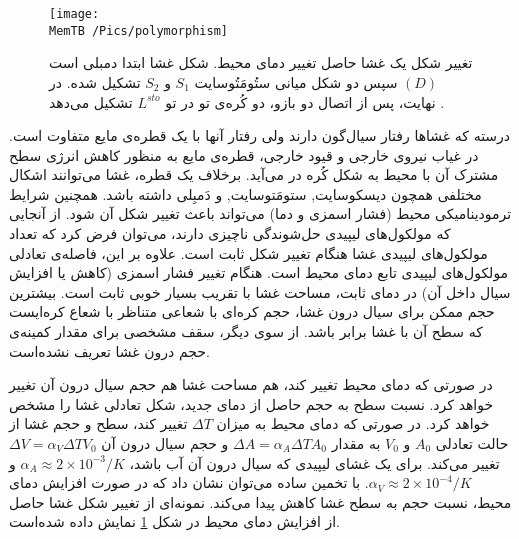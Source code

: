 \begin{figure}[t]
\begin{center}
\texttt{[image: \\MemTB /Pics/polymorphism]}
\caption{
تغییر شکل یک غشا حاصل تغییر دمای محیط. شکل غشا ابتدا دمبلی است 
$(D)$
سپس دو شکل میانی ستُومَتُوسایت
$S_1$
و
$S_2$
تشکیل شده. در نهایت، پس از اتصال دو بازو، دو کُره‌ی تو در تو 
$L^{sto}$
تشکیل می‌دهد 
\cite{Berndl1990EPL}.
}
\label{fig:shapeChanges}
\end{center}
\end{figure}

درسته که غشاها رفتار سیال‌گون دارند ولی رفتار آنها با یک قطره‌ی مایع متفاوت است. در غیاب نیروی خارجی و قیود خارجی، قطره‌ی مایع به منظور کاهش انرژی سطح مشترک آن با محیط به شکل کُره در می‌آید. برخلاف یک قطره، غشا می‌توانند اشکال مختلفی همچون دیسکوسایت,
 ستومَتوسایت,
 و  دَمبِلی داشته باشد. همچنین شرایط ترمودینامیکی محیط (فشار اسمزی و دما) می‌تواند باعث تغییر شکل آن شود. از آنجایی که مولکول‌های لیپیدی حل‌شوندگی ناچیزی دارند، می‌توان فرض کرد که تعداد مولکول‌های لیپیدی غشا هنگام تغییر شکل ثابت است. علاوه بر این، فاصله‌ی تعادلی مولکول‌های لیپیدی تابع دمای محیط است. هنگام تغییر فشار اسمزی (کاهش یا افزایش سیال داخل آن)  در دمای ثابت، مساحت غشا با تقریب بسیار خوبی ثابت است. بیشترین حجم ممکن برای سیال درون غشا، حجم کره‌ای با شعاعی متناظر با شعاع کره‌ایست که سطح آن با غشا برابر باشد. از سوی دیگر، سقف مشخصی برای مقدار کمینه‌ی حجم درون غشا تعریف نشده‌است.

در صورتی که دمای محیط تغییر کند، هم مساحت غشا هم حجم سیال درون آن تغییر خواهد کرد. نسبت سطح به حجم حاصل از دمای جدید، شکل تعادلی غشا را مشخص خواهد کرد. در صورتی که دمای محیط به میزان 
$\Delta T$
تغییر کند، سطح و حجم غشا از حالت تعادلی
$A_0$
و
$V_0$
به مقدار 
$\Delta A=\alpha_A\Delta T A_0$
و حجم سیال درون آن 
$\Delta V=\alpha_V\Delta T V_0$
تغییر می‌کند. برای یک غشای لیپیدی که سیال درون آن آب باشد،
$\alpha_A\approx2\times 10^{-3}/K$
و
$\alpha_V\approx2\times 10^{-4}/K$.
 با تخمین ساده می‌توان نشان ‌داد که در صورت افزایش دمای محیط، نسبت حجم به سطح غشا کاهش پیدا می‌کند. نمونه‌ای از تغییر شکل غشا حاصل از افزایش دمای محیط در شکل 
\ref{fig:shapeChanges}
نمایش داده شده‌است.

